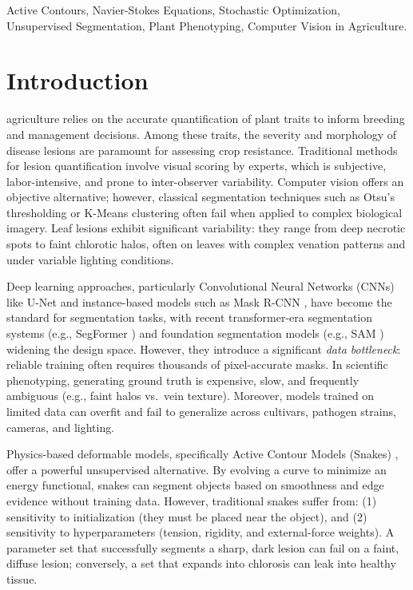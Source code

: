 \documentclass[journal]{IEEEtran}
\begin{document}
\begin{IEEEkeywords}
Active Contours, Navier-Stokes Equations, Stochastic Optimization, Unsupervised Segmentation, Plant Phenotyping, Computer Vision in Agriculture.
\end{IEEEkeywords}

\section{Introduction}
 agriculture relies on the accurate quantification of plant traits to inform breeding and management decisions. Among these traits, the severity and morphology of disease lesions are paramount for assessing crop resistance. Traditional methods for lesion quantification involve visual scoring by experts, which is subjective, labor-intensive, and prone to inter-observer variability. Computer vision offers an objective alternative; however, classical segmentation techniques such as Otsu's thresholding or K-Means clustering often fail when applied to complex biological imagery. Leaf lesions exhibit significant variability: they range from deep necrotic spots to faint chlorotic halos, often on leaves with complex venation patterns and under variable lighting conditions.

Deep learning approaches, particularly Convolutional Neural Networks (CNNs) like U-Net \cite{ronneberger2015u} and instance-based models such as Mask R-CNN \cite{he2017mask}, have become the standard for segmentation tasks, with recent transformer-era segmentation systems (e.g., SegFormer \cite{xie2021segformer}) and foundation segmentation models (e.g., SAM \cite{kirillov2023segment}) widening the design space. However, they introduce a significant \emph{data bottleneck}: reliable training often requires thousands of pixel-accurate masks. In scientific phenotyping, generating ground truth is expensive, slow, and frequently ambiguous (e.g., faint halos vs.\ vein texture). Moreover, models trained on limited data can overfit and fail to generalize across cultivars, pathogen strains, cameras, and lighting.

Physics-based deformable models, specifically Active Contour Models (Snakes) \cite{kass1988snakes}, offer a powerful unsupervised alternative. By evolving a curve to minimize an energy functional, snakes can segment objects based on smoothness and edge evidence without training data. However, traditional snakes suffer from: (1) sensitivity to initialization (they must be placed near the object), and (2) sensitivity to hyperparameters (tension, rigidity, and external-force weights). A parameter set that successfully segments a sharp, dark lesion can fail on a faint, diffuse lesion; conversely, a set that expands into chlorosis can leak into healthy tissue.
\end{document}
